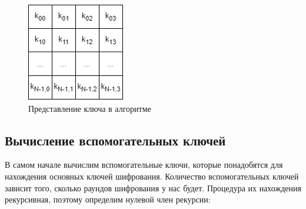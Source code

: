 \documentclass[12pt]{article}
\begin{document}
\begin{figure}[h]
    \centering
    \includegraphics[width=0.18\linewidth]{key.png}
    \caption{Представление ключа в алгоритме}
    \label{fig:scheme}
\end{figure}

\subsection{Вычисление вспомогательных ключей}
В самом начале вычислим вспомогательные ключи, которые понадобятся для нахождения основных ключей шифрования. Количество вспомогательных ключей зависит того, сколько раундов шифрования у нас будет. Процедура их нахождения рекурсивная, поэтому определим нулевой член рекурсии:
\end{document}
